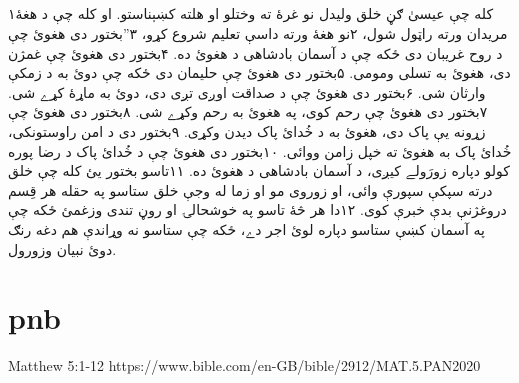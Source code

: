 \documentclass[12pt,fleqn,titlepage,twoside,a4paper]{book}
\begin{document}
\begin{arab}[utf]
\section*{}



۱کله چې عيسىٰ ګڼ خلق وليدل نو غرۀ ته وختلو او هلته کښېناستو. او کله چې د هغۀ مريدان ورته راټول شول، ۲نو هغۀ ورته داسې تعليم شروع کړو، ۳”بختور دى هغوئ چې د روح غريبان دى ځکه چې د آسمان بادشاهى د هغوئ ده. ۴بختور دى هغوئ چې غمژن دى، هغوئ به تسلى ومومى. ۵بختور دى هغوئ چې حليمان دى ځکه چې دوئ به د زمکې وارثان شى. ۶بختور دى هغوئ چې د صداقت اوږى تږى دى، دوئ به ماړۀ کړے شى. ۷بختور دى هغوئ چې رحم کوى، په هغوئ به رحم وکړے شى. ۸بختور دى هغوئ چې زړونه يې پاک دى، هغوئ به د خُدائ پاک ديدن وکړى. ۹بختور دى د امن راوستونکى، خُدائ پاک به هغوئ ته خپل زامن ووائى. ۱۰بختور دى هغوئ چې د خُدائ پاک د رضا پوره کولو دپاره زورَولے کيږى، د آسمان بادشاهى د هغوئ ده. ۱۱تاسو بختور يئ کله چې خلق درته سپکې سپورې وائى، او زوروى مو او زما له وجې خلق ستاسو په حقله هر قِسم دروغژنې بدې خبرې کوى. ۱۲دا هر څۀ تاسو په خوشحالۍ او روڼ تندى وزغمئ ځکه چې په آسمان کښې ستاسو دپاره لوئ اجر دے، ځکه چې ستاسو نه وړاندې هم دغه رنګ دوئ نبيان وزورول.

\end{arab}


\section{pnb}

Matthew 5:1-12 https://www.bible.com/en-GB/bible/2912/MAT.5.PAN2020
\end{document}
